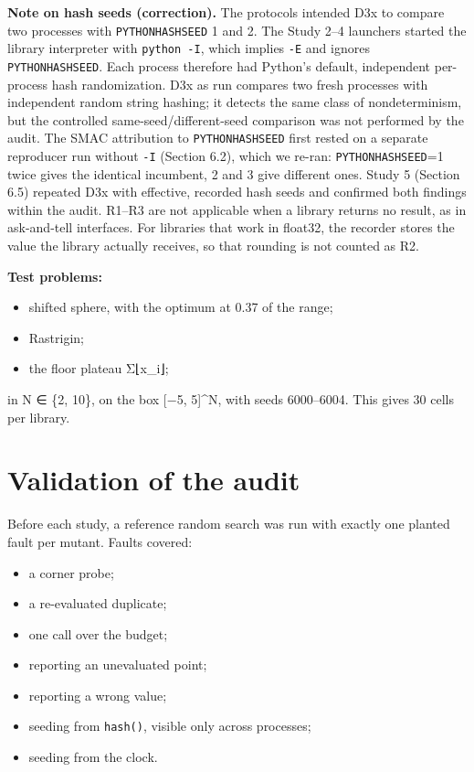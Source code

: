 \documentclass[acmsmall,screen,review,anonymous=false]{acmart}
\providecommand{\tightlist}{\setlength{\itemsep}{0pt}\setlength{\parskip}{0pt}}
\begin{document}
\textbf{Note on hash seeds (correction).} The protocols intended D3x to compare two processes with \texttt{PYTHONHASHSEED} 1 and 2.
The Study 2--4 launchers started the library interpreter with \texttt{python\ -I}, which implies \texttt{-E} and ignores
\texttt{PYTHONHASHSEED}. Each process therefore had Python's default, independent per-process hash randomization. D3x as
run compares two fresh processes with independent random string hashing; it detects the same class of
nondeterminism, but the controlled same-seed/different-seed comparison was not performed by the audit. The SMAC
attribution to \texttt{PYTHONHASHSEED} first rested on a separate reproducer run without \texttt{-I} (Section 6.2), which we re-ran:
\texttt{PYTHONHASHSEED}=1 twice gives the identical incumbent, 2 and 3 give different ones. Study 5 (Section 6.5) repeated
D3x with effective, recorded hash seeds and confirmed both findings within the audit. R1--R3 are not applicable
when a library returns no result, as in ask-and-tell interfaces. For libraries that work in float32, the recorder
stores the value the library actually receives, so that rounding is not counted as R2.

\textbf{Test problems:}

\begin{itemize}
\tightlist
\item
  shifted sphere, with the optimum at 0.37 of the range;
\item
  Rastrigin;
\item
  the floor plateau Σ⌊x\_i⌋;
\end{itemize}

in N ∈ \{2, 10\}, on the box {[}−5, 5{]}\^{}N, with seeds 6000--6004. This gives 30 cells per library.

\section{Validation of the audit}\label{validation-of-the-audit}

Before each study, a reference random search was run with exactly one planted fault per mutant. Faults covered:

\begin{itemize}
\tightlist
\item
  a corner probe;
\item
  a re-evaluated duplicate;
\item
  one call over the budget;
\item
  reporting an unevaluated point;
\item
  reporting a wrong value;
\item
  seeding from \texttt{hash()}, visible only across processes;
\item
  seeding from the clock.
\end{itemize}
\end{document}
